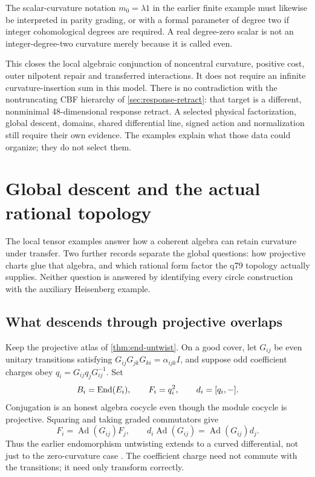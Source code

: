 \documentclass[11pt,a4paper]{article}
\begin{document}
The scalar-curvature notation \(m_0=\lambda1\) in the earlier finite
example must likewise be interpreted in parity grading, or with a
formal parameter of degree two if integer cohomological degrees are
required. A real degree-zero scalar is not an integer-degree-two
curvature merely because it is called even.

This closes the local algebraic conjunction of noncentral curvature,
positive cost, outer nilpotent repair and transferred interactions.
It does not require an infinite curvature-insertion sum in this model.
There is no contradiction with the nontruncating CBF hierarchy of
\cref{sec:response-retract}: that target is a different, nonminimal
48-dimensional response retract. A selected physical factorization,
global descent, domains, shared differential line, signed action and
normalization still require their own evidence. The examples explain
what those data could organize; they do not select them.

\section{Global descent and the actual rational topology}
\label{sec:morita-hirsch}

The local tensor examples answer how a coherent algebra can retain
curvature under transfer. Two further records separate the global
questions: how projective charts glue that algebra, and which rational
form factor the q79 topology actually supplies. Neither question is
answered by identifying every circle construction with the auxiliary
Heisenberg example.

\subsection{What descends through projective overlaps}
\label{sec:morita-curved-descent}
Keep the projective atlas of \cref{thm:end-untwist}. On a good cover,
let \(G_{ij}\) be even unitary transitions satisfying
\(G_{ij}G_{jk}G_{ki}=\alpha_{ijk}I\), and suppose odd coefficient charges
obey \(q_i=G_{ij}q_jG_{ij}^{-1}\). Set
\[
 B_i=\operatorname{End}(E_i),\qquad F_i=q_i^2,\qquad d_i=[q_i,-].
\]
Conjugation is an honest algebra cocycle even though the module cocycle
is projective. Squaring and taking graded commutators give
\[
 F_i=\operatorname{Ad}(G_{ij})F_j,\qquad
 d_i\operatorname{Ad}(G_{ij})=\operatorname{Ad}(G_{ij})d_j .
\]
Thus the earlier endomorphism untwisting extends to a curved
differential, not just to the zero-curvature case
\cite{PreprojectionMoritaDescent2026}. The coefficient charge need not
commute with the transitions; it need only transform correctly.
\end{document}
